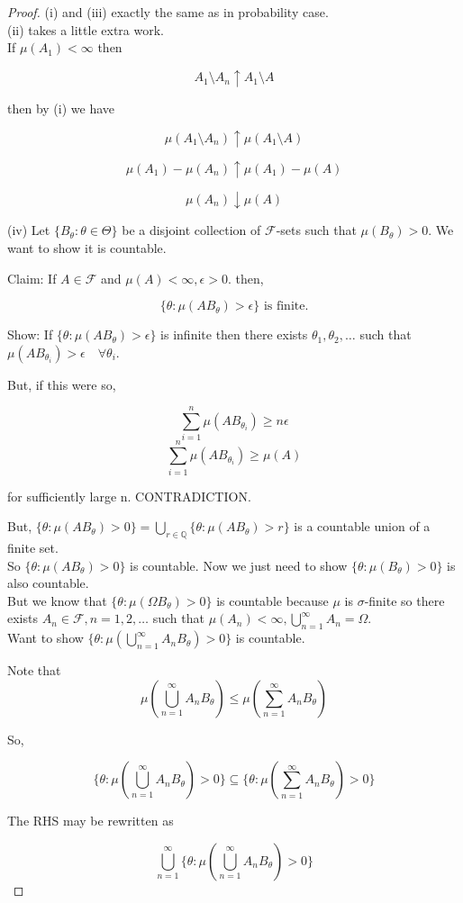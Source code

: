 \documentclass[11pt,fleqn]{book} %
\begin{document}
	\begin{proof}
		(i) and (iii) exactly the same as in probability case.\\

		(ii) takes a little extra work.\\

		If $\mu(A_1) < \infty$ then 

			$$A_1 \setminus A_n \uparrow A_1 \setminus A $$

		then by (i) we have

			$$\mu(A_1\setminus A_n) \uparrow \mu(A_1 \setminus A) $$

			$$\mu(A_1) - \mu(A_n) \uparrow \mu(A_1) - \mu(A) $$

			$$\mu(A_n) \downarrow \mu(A) $$

		(iv) Let $\{B_\theta: \theta \in \Theta \}$ be a disjoint collection of $\mathcal{F}$-sets such that $\mu(B_\theta)>0$. We want to show it is countable.
		
			Claim: If $A \in  \mathcal{F}$ and $\mu(A) < \infty, \epsilon > 0.$ then, 

					$$ \{\theta: \mu(AB_\theta) > \epsilon \} \text{ is finite.} $$

			Show: If $\{\theta: \mu(AB_\theta) > \epsilon \}$ is infinite then there exists $\theta_1, \theta_2, \dots$ such that $\mu(AB_{\theta_i}) > \epsilon \quad \forall \theta_i$.

			 But, if this were so, 

			 		$$\displaystyle \sum^n_{i = 1} \mu(A B_{\theta_i}) \geq n\epsilon  $$
			 		$$\displaystyle \sum^n_{i = 1} \mu(A B_{\theta_i}) \geq \mu(A)  $$

			 for sufficiently large n. CONTRADICTION.

			 But, $\{\theta: \mu(AB_\theta) > 0 \} = \bigcup_{r \in \mathbb{Q}}\{\theta: \mu(AB_\theta) > r \}$ is a countable union of a finite set. \\

			 So $\{\theta: \mu(AB_\theta) > 0\}$ is countable. Now we just need to show $\{\theta: \mu(B_\theta) > 0 \}$ is also countable.\\

			 But we know that $\{\theta: \mu(\Omega B_\theta) > 0 \}$ is countable because $\mu$ is $\sigma$-finite so there exists $A_n \in \mathcal{F}, n = 1, 2, \dots$ such that $\mu(A_n) < \infty, \bigcup^\infty_{n=1} A_n = \Omega$.\\

			 Want to show $\{\theta: \mu(\bigcup^\infty_{n=1} A_n B_\theta) > 0 \}$ is countable.

			 Note that 
			 		$$ \mu(\bigcup^\infty_{n=1} A_n B_\theta) \leq \mu(\displaystyle \sum^\infty_{n=1} A_n B_\theta)$$

			 So, 

			 	$$\{\theta: \mu(\bigcup^\infty_{n=1} A_n B_\theta) > 0 \} \subseteq \{\theta: \mu(\displaystyle \sum^\infty_{n=1} A_n B_\theta) > 0 \} $$

			 The RHS may be rewritten as

			 	$$\bigcup^\infty_{n=1} \{\theta: \mu(\bigcup^\infty_{n=1} A_n B_\theta) > 0 \}  $$


	\end{proof}
\end{document}
